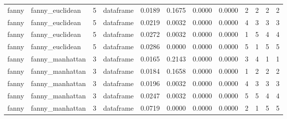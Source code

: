 {\begin{longtable}{| p{1cm} | p{1.8cm} | p{0.7cm} | p{0.9cm} | p{0.5cm} | p{0.65cm} | p{0.5cm} | p{0.5cm} | p{0.55cm} | p{0.55cm} | p{0.6cm} | p{0.5cm} |}
\scriptsize   fanny   & \scriptsize  fanny\_euclidean & \scriptsize    5    & \scriptsize dataframe & \scriptsize    0.0189  &  \scriptsize 0.1675 & \scriptsize 0.0000 & \scriptsize    0.0000 & \scriptsize   2  & \scriptsize    2  & \scriptsize    2  & \scriptsize    2 \\
\scriptsize   fanny   & \scriptsize  fanny\_euclidean & \scriptsize    5    & \scriptsize dataframe & \scriptsize    0.0219  &  \scriptsize 0.0032 & \scriptsize 0.0000 & \scriptsize    0.0000 & \scriptsize   4  & \scriptsize    3  & \scriptsize    3  & \scriptsize    3 \\
\scriptsize   fanny   & \scriptsize  fanny\_euclidean & \scriptsize    5    & \scriptsize dataframe & \scriptsize    0.0272  &  \scriptsize 0.0032 & \scriptsize 0.0000 & \scriptsize    0.0000 & \scriptsize   1  & \scriptsize    5  & \scriptsize    4  & \scriptsize    4 \\
\scriptsize   fanny   & \scriptsize  fanny\_euclidean & \scriptsize    5    & \scriptsize dataframe & \scriptsize    0.0286  &  \scriptsize 0.0000 & \scriptsize 0.0000 & \scriptsize    0.0000 & \scriptsize   5  & \scriptsize    1  & \scriptsize    5  & \scriptsize    5 \\
\cline{2-12}
\scriptsize   fanny   & \scriptsize  fanny\_manhattan & \scriptsize    3    & \scriptsize dataframe & \scriptsize    0.0165  &  \scriptsize 0.2143 & \scriptsize 0.0000 & \scriptsize    0.0000 & \scriptsize   3  & \scriptsize    4  & \scriptsize    1  & \scriptsize    1 \\
\scriptsize   fanny   & \scriptsize  fanny\_manhattan & \scriptsize    3    & \scriptsize dataframe & \scriptsize    0.0184  &  \scriptsize 0.1658 & \scriptsize 0.0000 & \scriptsize    0.0000 & \scriptsize   1  & \scriptsize    2  & \scriptsize    2  & \scriptsize    2 \\
\scriptsize   fanny   & \scriptsize  fanny\_manhattan & \scriptsize    3    & \scriptsize dataframe & \scriptsize    0.0196  &  \scriptsize 0.0032 & \scriptsize 0.0000 & \scriptsize    0.0000 & \scriptsize   4  & \scriptsize    3  & \scriptsize    3  & \scriptsize    3 \\
\scriptsize   fanny   & \scriptsize  fanny\_manhattan & \scriptsize    3    & \scriptsize dataframe & \scriptsize    0.0247  &  \scriptsize 0.0032 & \scriptsize 0.0000 & \scriptsize    0.0000 & \scriptsize   5  & \scriptsize    5  & \scriptsize    4  & \scriptsize    4 \\
\scriptsize   fanny   & \scriptsize  fanny\_manhattan & \scriptsize    3    & \scriptsize dataframe & \scriptsize    0.0719  &  \scriptsize 0.0000 & \scriptsize 0.0000 & \scriptsize    0.0000 & \scriptsize   2  & \scriptsize    1  & \scriptsize    5  & \scriptsize    5 \\

\end{longtable}}
